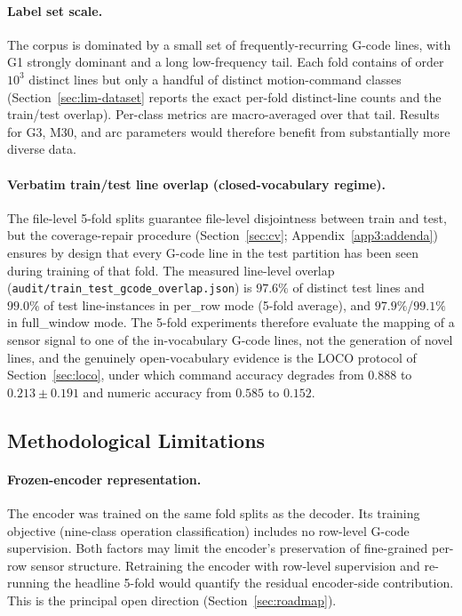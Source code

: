 \documentclass[sensors,article,submit,moreauthors,pdftex]{Definitions/mdpi}
\begin{document}
\paragraph{Label set scale.} The corpus is dominated by a small set of frequently-recurring G-code lines, with G1 strongly dominant and a long low-frequency tail. Each fold contains of order $10^3$ distinct lines but only a handful of distinct motion-command classes (Section~\ref{sec:lim-dataset} reports the exact per-fold distinct-line counts and the train/test overlap). Per-class metrics are macro-averaged over that tail. Results for G3, M30, and arc parameters would therefore benefit from substantially more diverse data.

\paragraph{Verbatim train/test line overlap (closed-vocabulary regime).} The file-level 5-fold splits guarantee file-level disjointness between train and test, but the coverage-repair procedure (Section~\ref{sec:cv}; Appendix~\ref{app3:addenda}) ensures by design that every G-code line in the test partition has been seen during training of that fold. The measured line-level overlap (\texttt{audit/train\_test\_gcode\_overlap.json}) is $97.6\%$ of distinct test lines and $99.0\%$ of test line-instances in per\_row mode (5-fold average), and $97.9\%$/$99.1\%$ in full\_window mode. The 5-fold experiments therefore evaluate the mapping of a sensor signal to one of the in-vocabulary G-code lines, not the generation of novel lines, and the genuinely open-vocabulary evidence is the LOCO protocol of Section~\ref{sec:loco}, under which command accuracy degrades from $0.888$ to $0.213 \pm 0.191$ and numeric accuracy from $0.585$ to $0.152$.

\subsection{Methodological Limitations}
\label{sec:lim-method}

\paragraph{Frozen-encoder representation.} The encoder was trained on the same fold splits as the decoder. Its training objective (nine-class operation classification) includes no row-level G-code supervision. Both factors may limit the encoder's preservation of fine-grained per-row sensor structure. Retraining the encoder with row-level supervision and re-running the headline 5-fold would quantify the residual encoder-side contribution. This is the principal open direction (Section~\ref{sec:roadmap}).
\end{document}
